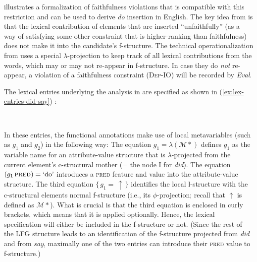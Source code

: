 \documentclass[output=paper,hidelinks]{langscibook}
\begin{document}
 illustrates a formalization of faithfulness violations that is compatible with this restriction and can be used to derive \emph{do} insertion in English. The key idea from \citet[ex.~44]{bresnan00opt} is that the lexical contribution of elements that are inserted ``unfaithfully'' (as a way of satisfying some other constraint that is higher-ranking than faithfulness) does not make it into the candidate's f-structure. The technical operationalization from \citet[112]{Kuhn-CSLI-book} uses a special $\lambda$-projection to keep track of all lexical contributions from the words, which may or may not re-appear in f-structure. In case they do \emph{not} re-appear, a violation of a faithfulness constraint (\textsc{Dep-IO}) will be recorded by \emph{Eval}.


The lexical entries underlying the analysis in  are specified as shown in (\ref{ex:lex-entries-did-say})  \citep[adapted from][ex.~140]{Kuhn-CSLI-book}: 

\ea\label{ex:lex-entries-did-say}
\\[1ex]
\z

\noindent
In these entries, the functional annotations make use of local metavariables (such as $g_1$ and $g_2$) in the following way:
The equation $g_1 = \lambda({\mathcal M}*)$ defines $g_1$ as the variable name for an attribute-value structure that is $\lambda$-projected from the current element's c-structural mother (= the node I for \emph{did}). The equation $(g_1 \, \textsc{pred}) = \textrm{`do'}$ introduces a \textsc{pred} feature and value into the attribute-value structure. The third equation $\{ \, g_1 = \, \uparrow \, \}$ identifies the local l-structure with the c-structural elements normal f-structure (i.e., its $\phi$-projection; recall that $\uparrow$ is defined as ${\mathcal M}*$). What is crucial is that the third equation is enclosed in curly brackets, which means that it is applied optionally. Hence, the lexical specification will either be included in the f-structure or not. (Since the rest of the LFG structure leads to an identification of the f-structure projected from \emph{did} and from \emph{say}, maximally one of the two entries can introduce their \textsc{pred} value to f-structure.)
\end{document}
